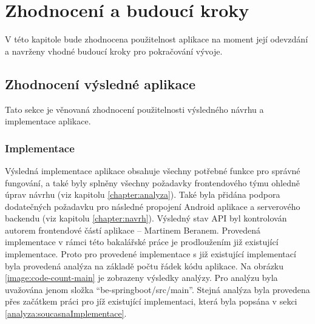 \chapter{Zhodnocení a budoucí kroky}\label{zhodnocení}
V této kapitole bude zhodnocena použitelnost aplikace na moment její odevzdání a navrženy vhodné budoucí kroky pro pokračování vývoje.
\section{Zhodnocení výsledné aplikace}
    Tato sekce je věnovaná zhodnocení použitelnosti výsledného návrhu a implementace aplikace. 
    \subsection{Implementace}
        Výsledná implementace aplikace obsahuje všechny potřebné funkce pro správné fungování, a také byly splněny všechny požadavky frontendového týmu ohledně úprav návrhu (viz kapitolu \ref{chapter:analyza}). Také byla přidána podpora dodatečných požadavku pro následné propojení Android aplikace a serverového backendu (viz kapitolu \ref{chapter:navrh}). Výsledný stav API byl kontrolován autorem frontendové částí aplikace -- Martinem Beranem.
        Provedená implementace v rámci této bakalářské práce je prodloužením již existující implementace. Proto pro provedené implementace s již existující implementací byla provedená analýza na základě počtu řádek kódu aplikace. Na obrázku \ref{image:code-count-main} je zobrazeny výsledky analýzy. 
        Pro analýzu byla uvažována jenom složka \enquote{be-springboot/src/main}. Stejná analýza byla provedena přes začátkem práci pro jíž existující implementaci, která byla popsána v sekci \ref{analyza:soucasnaImplementace}.
